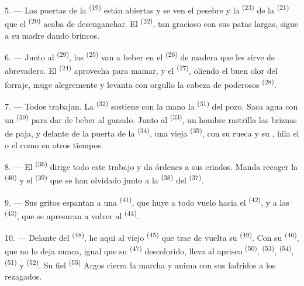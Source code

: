 5. --- Las puertas de la  \textsuperscript{(19)} están abiertas y se ven
el pesebre y la  \textsuperscript{(23)} de la 
\textsuperscript{(21)} que el  \textsuperscript{(20)} acaba de
desenganchar. El  \textsuperscript{(22)}, tan gracioso con sus patas
largas, sigue a su madre dando brincos.

6. --- Junto al  \textsuperscript{(29)}, las 
\textsuperscript{(25)} van a beber en el  \textsuperscript{(26)} de madera que
les sirve de abrevadero. El  \textsuperscript{(24)} aprovecha para
mamar, y el  \textsuperscript{(27)}, oliendo el buen olor del forraje,
muge alegremente y levanta con orgullo la cabeza de poderosos
 \textsuperscript{(28)}.

7. --- Todos trabajan. La  \textsuperscript{(32)} sostiene con la mano
la  \textsuperscript{(31)} del pozo. Saca agua con un 
\textsuperscript{(30)} para dar de beber al ganado. Junto al 
\textsuperscript{(33)}, un hombre rastrilla las briznas de paja, y delante de la
puerta de la  \textsuperscript{(34)}, una vieja 
\textsuperscript{(35)}, con su rueca y su , hila el  o el
 como en otros tiempos.

\VUsaut{3.0mm}
\VUsaut{3.0mm}

8. --- El  \textsuperscript{(36)} dirige todo este trabajo y da
órdenes a sus criados. Manda recoger la  \textsuperscript{(40)} y el
 \textsuperscript{(39)} que se han olvidado junto a la 
\textsuperscript{(38)} del  \textsuperscript{(37)}.

9. --- Sus gritos espantan a una  \textsuperscript{(41)}, que huye a
todo vuelo hacia el  \textsuperscript{(42)}, y a las 
\textsuperscript{(43)}, que se apresuran a volver al 
\textsuperscript{(44)}.

10. --- Delante del  \textsuperscript{(48)}, he aquí al viejo
 \textsuperscript{(45)} que trae de vuelta su 
\textsuperscript{(49)}. Con su  \textsuperscript{(46)}, que no lo deja nunca,
igual que su  \textsuperscript{(47)} descolorido, lleva al aprisco
 \textsuperscript{(50)},  \textsuperscript{(53)},
 \textsuperscript{(54)},  \textsuperscript{(51)} y
 \textsuperscript{(52)}. Su fiel  \textsuperscript{(55)} Argos
cierra la marcha y anima con sus ladridos a los rezagados.

